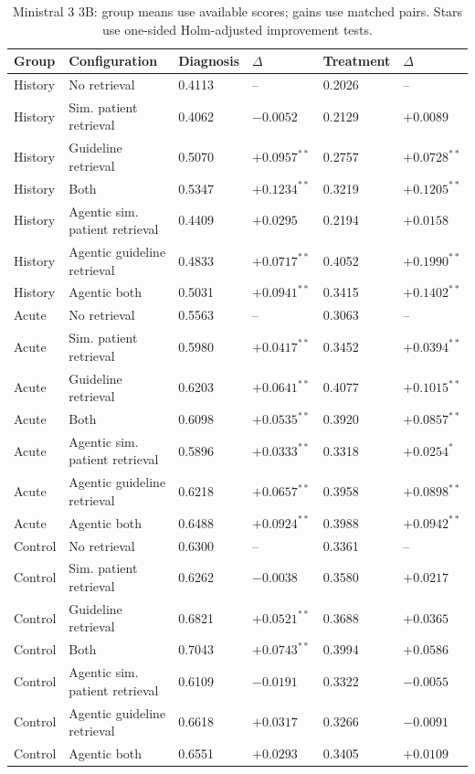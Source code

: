\begin{table}[t]
\centering
\scriptsize
\begin{tabular}{llllll}
\toprule
Group & Configuration & Diagnosis & $\Delta$ & Treatment & $\Delta$ \\
\midrule
History & No retrieval & 0.4113 & -- & 0.2026 & -- \\
History & Sim. patient retrieval & 0.4062 & $-0.0052$ & 0.2129 & $+0.0089$ \\
History & Guideline retrieval & 0.5070 & $+0.0957^{**}$ & 0.2757 & $+0.0728^{**}$ \\
History & Both & 0.5347 & $+0.1234^{**}$ & 0.3219 & $+0.1205^{**}$ \\
History & Agentic sim. patient retrieval & 0.4409 & $+0.0295$ & 0.2194 & $+0.0158$ \\
History & Agentic guideline retrieval & 0.4833 & $+0.0717^{**}$ & 0.4052 & $+0.1990^{**}$ \\
History & Agentic both & 0.5031 & $+0.0941^{**}$ & 0.3415 & $+0.1402^{**}$ \\
\midrule
Acute & No retrieval & 0.5563 & -- & 0.3063 & -- \\
Acute & Sim. patient retrieval & 0.5980 & $+0.0417^{**}$ & 0.3452 & $+0.0394^{**}$ \\
Acute & Guideline retrieval & 0.6203 & $+0.0641^{**}$ & 0.4077 & $+0.1015^{**}$ \\
Acute & Both & 0.6098 & $+0.0535^{**}$ & 0.3920 & $+0.0857^{**}$ \\
Acute & Agentic sim. patient retrieval & 0.5896 & $+0.0333^{**}$ & 0.3318 & $+0.0254^{*}$ \\
Acute & Agentic guideline retrieval & 0.6218 & $+0.0657^{**}$ & 0.3958 & $+0.0898^{**}$ \\
Acute & Agentic both & 0.6488 & $+0.0924^{**}$ & 0.3988 & $+0.0942^{**}$ \\
\midrule
Control & No retrieval & 0.6300 & -- & 0.3361 & -- \\
Control & Sim. patient retrieval & 0.6262 & $-0.0038$ & 0.3580 & $+0.0217$ \\
Control & Guideline retrieval & 0.6821 & $+0.0521^{**}$ & 0.3688 & $+0.0365$ \\
Control & Both & 0.7043 & $+0.0743^{**}$ & 0.3994 & $+0.0586$ \\
Control & Agentic sim. patient retrieval & 0.6109 & $-0.0191$ & 0.3322 & $-0.0055$ \\
Control & Agentic guideline retrieval & 0.6618 & $+0.0317$ & 0.3266 & $-0.0091$ \\
Control & Agentic both & 0.6551 & $+0.0293$ & 0.3405 & $+0.0109$ \\
\midrule
\bottomrule
\end{tabular}
\caption{Ministral 3 3B: group means use available scores; gains use matched pairs. Stars use one-sided Holm-adjusted improvement tests.}
\end{table}
